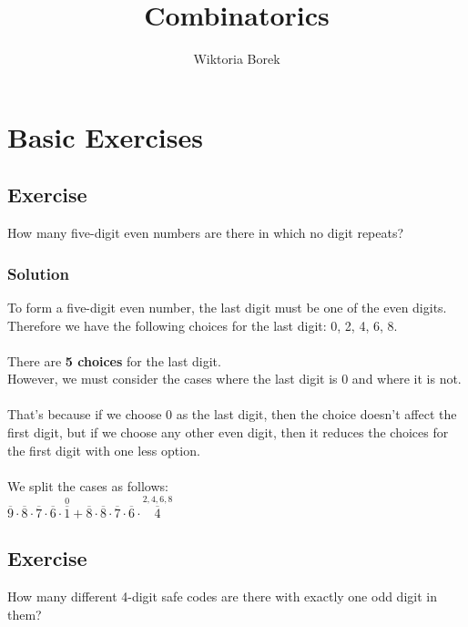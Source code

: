 \documentclass{article}
\title{Combinatorics}
\author{Wiktoria Borek}
\date{}
\begin{document}
\maketitle

\section{Basic Exercises}
\subsection{Exercise}
How many five-digit even numbers are there in which no digit repeats?
\subsubsection*{Solution}
To form a five-digit even number, the last digit must be one of the even digits.\\
Therefore we have the following choices for the last digit: 0, 2, 4, 6, 8.\\
\\
There are \textbf{5 choices} for the last digit.\\
However, we must consider the cases where the last digit is 0 and where it is not.\\
\\
That's because if we choose 0 as the last digit, then the choice doesn't affect the first digit,
but if we choose any other even digit, then it reduces the choices for the first digit with one less option.\\
\\
We split the cases as follows:\\
$\overset{}{\overline{9}} \cdot \overset{}{\overline{8}} \cdot \overset{}{\overline{7}} \cdot \overset{}{\overline{6}} \cdot \overset{0}{\overline{1}} + \overset{}{\overline{8}} \cdot \overset{}{\overline{8}} \cdot \overset{}{\overline{7}} \cdot \overset{}{\overline{6}} \cdot \overset{2,4,6,8}{\overline{4}}$
\subsection{Exercise}
How many different 4-digit safe codes are there with exactly one odd digit in them?
\end{document}
